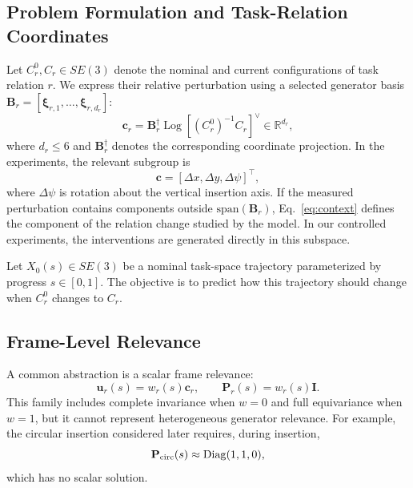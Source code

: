 \documentclass[letterpaper,10pt,conference]{ieeeconf}
\DeclareMathOperator{\Log}{Log}
\begin{document}
\subsection{Problem Formulation and Task-Relation Coordinates}
\label{sec:problem_formulation}

Let $C_r^0,C_r\in SE(3)$ denote the nominal and current configurations of task
relation $r$. We express their relative perturbation using a selected generator
basis $\mathbf B_r=[\bm\xi_{r,1},\ldots,\bm\xi_{r,d_r}]$:
\begin{equation}
    \bm c_r =
    \mathbf B_r^{\dagger}
    \Log\!\left[(C_r^0)^{-1}C_r\right]^\vee
    \in\mathbb R^{d_r},
    \label{eq:context}
\end{equation}
where $d_r\leq6$ and $\mathbf B_r^\dagger$ denotes the corresponding coordinate
projection. In the experiments, the relevant subgroup is
\begin{equation}
    \bm c=[\Delta x,\Delta y,\Delta\psi]^\top,
\end{equation}
where $\Delta\psi$ is rotation about the vertical insertion axis.
If the measured perturbation contains components outside
$\mathrm{span}(\mathbf B_r)$, Eq.~\eqref{eq:context} defines the component of
the relation change studied by the model. In our controlled experiments, the
interventions are generated directly in this subspace.

Let $X_0(s)\in SE(3)$ be a nominal task-space trajectory parameterized by
progress $s\in[0,1]$. The objective is to predict how this trajectory should
change when $C_r^0$ changes to $C_r$.

\subsection{Frame-Level Relevance}

A common abstraction is a scalar frame relevance:
\begin{equation}
    \bm u_r(s)=w_r(s)\bm c_r,\qquad
    \mathbf P_r(s)=w_r(s)\mathbf I.
    \label{eq:scalar}
\end{equation}
This family includes complete invariance when $w=0$ and full equivariance when
$w=1$, but it cannot represent heterogeneous generator relevance. For example,
the circular insertion considered later requires, during insertion,
\begin{equation}
    \mathbf P_{\rm circ}(s)
    \approx \mathrm{Diag}(1,1,0),
    \label{eq:circular_target}
\end{equation}
which has no scalar solution.
\end{document}
